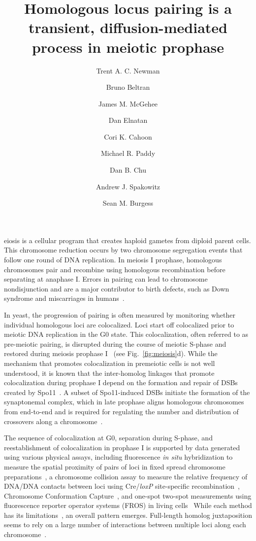 \documentclass[9pt,twocolumn,twoside,lineno]{pnas-new}
\title{Homologous locus pairing is a transient, diffusion-mediated process in meiotic prophase}
\author[a,1]{Trent A. C. Newman}
\author[b,1]{Bruno Beltran}
\author[a,2]{James M. McGehee}
\author[a,2]{Dan Elnatan}
\author[a,2]{Cori K. Cahoon}
\author{Michael R. Paddy}
\author{Dan B. Chu}
\author[b,3]{Andrew J. Spakowitz}
\author[a,3]{Sean M. Burgess}
\affil{Department of Molecular and Cellular Biology, University of California, Davis, Davis, California}
\affil{Department of Chemical Engineering, Stanford University, Stanford, California}
\begin{document}
\verticaladjustment{-2pt}
\maketitle
\thispagestyle{firststyle}


eiosis is a cellular program that creates haploid gametes from diploid parent cells. This chromosome reduction occurs by two chromosome segregation events that follow one round of DNA replication. In meiosis I prophase, homologous chromosomes pair and recombine using homologous recombination before separating at anaphase I. Errors in pairing can lead to chromosome nondisjunction and are a major contributor to birth defects, such as Down syndrome and miscarriages in humans~\cite{antonarakis1992,nagaoka2012}.

In yeast, the progression of pairing is often measured by monitoring whether individual homologous loci are colocalized. Loci start off colocalized prior to meiotic DNA replication in the G0 state. This colocalization, often referred to as pre-meiotic pairing, is disrupted during the course of meiotic S-phase and restored during meiosis prophase I~\cite{weiner1994,cha2000} (see Fig.~\ref{fig:meiosis}d). While the mechanism that promotes colocalization in premeiotic cells is not well understood, it is known that the inter-homolog linkages that promote colocalization during prophase I depend on the formation and repair of DSBs created by Spo11~\cite{keeney1997,zickler2015}. A subset of Spo11-induced DSBs initiate the formation of the synaptonemal complex, which in late prophase aligns homologous chromosomes from end-to-end and is required for regulating the number and distribution of crossovers along a chromosome~\cite{zickler2015}.

The sequence of colocalization at G0, separation during S-phase, and reestablishment of colocalization in prophase I is supported by data generated using various physical assays, including fluorescence \textit{in situ} hybridization to measure the spatial proximity of pairs of loci in fixed spread chromosome preparations~\cite{weiner1994,loidl1994}, a chromosome collision assay to measure the relative frequency of DNA/DNA contacts between loci using Cre/\textit{loxP} site-specific recombination~\cite{peoples2002}, Chromosome Conformation Capture~\cite{dekker2002,kim2017}, and one-spot two-spot measurements using fluorescence reporter operator systems (FROS) in living cells~\cite{brar2009,lee2012} While each method has its limitations~\cite{fuchs2002, mirkin2014}, an overall pattern emerges. Full-length homolog juxtaposition seems to rely on a large number of interactions between multiple loci along each chromosome~\cite{kleckner1993}.
\end{document}
